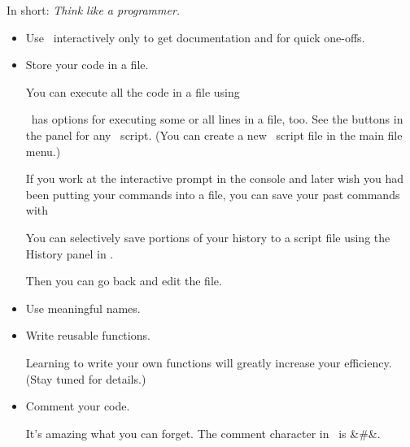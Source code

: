 In short: \emph{Think like a programmer.}  
\begin{itemize}
  \item Use \R\ interactively only to get documentation and for quick one-offs.
  \item Store your code in a file.  %

\smallskip
  You can execute all the code in a file using 

\begin{knitrout}
\end{knitrout}

\Rstudio\ has options for executing some or all lines in a file, too. 
See the buttons in the panel for any \R\ script.  (You can create a new \R\ script
file in the main file menu.)

\smallskip\noindent
If you work at the interactive prompt in the console and later wish you had 
been putting your commands into a file, you can save your past commands with

\begin{knitrout}
\end{knitrout}


You can selectively save portions of your history to a script file
using the History panel in \Rstudio.

\noindent
Then you can go back and edit the file.



  \item Use meaningful names.
  \item Write reusable functions.

  Learning to write your own functions will greatly increase your efficiency.
  (Stay tuned for details.)

  \item Comment your code.

  It's amazing what you can forget.  The comment character in \R\ is &#&.
  \Rindex{\#}%
\end{itemize}

